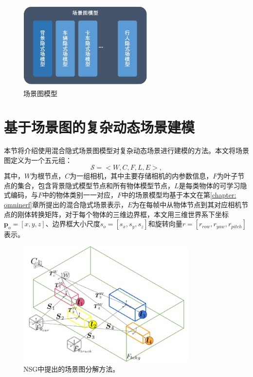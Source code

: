 \begin{figure}[ht]
    \centering
    \includegraphics[width=0.6\textwidth]{undergraduate-thesis/images/related-work/scene-graph.pdf}
    \caption{场景图模型}
    \label{fig:scene-graph model}
\end{figure}

\section{基于场景图的复杂动态场景建模}

本节将介绍使用混合隐式场景图模型对复杂动态场景进行建模的方法。本文将场景图定义为一个五元组\cite{ost_neural_2021}：
\begin{equation}
    \mathcal{S} = <W, C, F, L, E>,
\end{equation}
其中，$W$为根节点，$C$为一组相机，其中主要存储相机的内参数信息，$F$为叶子节点的集合，包含背景隐式模型节点和所有物体模型节点，$L$是每类物体的可学习隐式编码，与$F$中的物体类别一一对应，$F$中的场景模型均基于本文在第\ref{chapter: omninerf}章所提出的混合隐式场景表示，$E$为在每帧中从物体节点到其对应相机节点的刚体转换矩阵，对于每个物体的三维边界框，本文用三维世界系下坐标$\mathbf{p}_o = [x, y, z]$、边界框大小尺度$s_o = [s_x, s_y, s_z]$和旋转向量$r = [r_{row}, r_{yaw}, r_{pitch}]$表示。

\begin{figure}[ht]
    \centering
    \includegraphics[width=0.8\textwidth]{undergraduate-thesis/images/related-work/nsg-scene-graph visualization.png}
    \caption{NSG\cite{ost_neural_2021}中提出的场景图分解方法。}
    \label{fig:NSG scene graph}
\end{figure}

